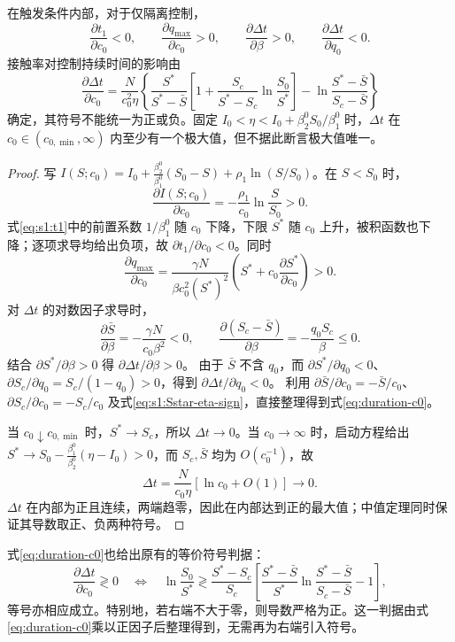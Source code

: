 \begin{proposition}
\label{prop:contact-effects}\label{cor:s1:duration-sensitivity}
在触发条件内部，对于仅隔离控制，
\[
\frac{\partial t_1}{\partial c_0}<0,\qquad
\frac{\partial q_{\max}}{\partial c_0}>0,\qquad
\frac{\partial\Delta t}{\partial\beta}>0,\qquad
\frac{\partial\Delta t}{\partial q_0}<0.
\]
接触率对控制持续时间的影响由
\begin{equation}
\frac{\partial\Delta t}{\partial c_0}
=\frac{N}{c_0^2\eta}
\left\{\frac{S^*}{S^*-\bar S}
\left[1+\frac{S_c}{S^*-S_c}\ln\frac{S_0}{S^*}\right]
-\ln\frac{S^*-\bar S}{S_c-\bar S}\right\}
\label{eq:duration-c0}
\end{equation}
确定，其符号不能统一为正或负。固定 $I_0<\eta<I_0+\beta_2^0S_0/\beta_1^0$ 时，$\Delta t$ 在 $c_0\in(c_{0,\min},\infty)$ 内至少有一个极大值，但不据此断言极大值唯一。
\end{proposition}
\begin{proof}
写 $I(S;c_0)=I_0+\frac{\beta_2^0}{\beta_1^0}(S_0-S)+\rho_1\ln(S/S_0)$。在 $S<S_0$ 时，
\[
\frac{\partial I(S;c_0)}{\partial c_0}=-\frac{\rho_1}{c_0}\ln\frac{S}{S_0}>0.
\]
式\eqref{eq:s1:t1}中的前置系数 $1/\beta_1^0$ 随 $c_0$ 下降，下限 $S^*$ 随 $c_0$ 上升，被积函数也下降；逐项求导均给出负项，故 $\partial t_1/\partial c_0<0$。同时
\[
\frac{\partial q_{\max}}{\partial c_0}
=\frac{\gamma N}{\beta c_0^2(S^*)^2}
\left(S^*+c_0\frac{\partial S^*}{\partial c_0}\right)>0.
\]
对 $\Delta t$ 的对数因子求导时，
\[
\frac{\partial\bar S}{\partial\beta}=-\frac{\gamma N}{c_0\beta^2}<0,
\qquad
\frac{\partial(S_c-\bar S)}{\partial\beta}=-\frac{q_0S_c}{\beta}\le0.
\]
结合 $\partial S^*/\partial\beta>0$ 得 $\partial\Delta t/\partial\beta>0$。
由于 $\bar S$ 不含 $q_0$，而 $\partial S^*/\partial q_0<0$、$\partial S_c/\partial q_0=S_c/(1-q_0)>0$，得到 $\partial\Delta t/\partial q_0<0$。
利用 $\partial\bar S/\partial c_0=-\bar S/c_0$、$\partial S_c/\partial c_0=-S_c/c_0$ 及式\eqref{eq:s1:Sstar-eta-sign}，直接整理得到式\eqref{eq:duration-c0}。

当 $c_0\downarrow c_{0,\min}$ 时，$S^*\to S_c$，所以 $\Delta t\to0$。当 $c_0\to\infty$ 时，启动方程给出
$S^*\to S_0-\frac{\beta_1^0}{\beta_2^0}(\eta-I_0)>0$，而 $S_c,\bar S$ 均为 $O(c_0^{-1})$，故
\[
\Delta t=\frac{N}{c_0\eta}[\ln c_0+O(1)]\longrightarrow0.
\]
$\Delta t$ 在内部为正且连续，两端趋零，因此在内部达到正的最大值；中值定理同时保证其导数取正、负两种符号。
\end{proof}
式\eqref{eq:duration-c0}也给出原有的等价符号判据：
\begin{equation}
\frac{\partial\Delta t}{\partial c_0}\gtrless0
\quad\Longleftrightarrow\quad
\ln\frac{S_0}{S^*}\gtrless
\frac{S^*-S_c}{S_c}
\left[\frac{S^*-\bar S}{S^*}\ln\frac{S^*-\bar S}{S_c-\bar S}-1\right],
\label{eq:duration-c0-equivalent}
\end{equation}
等号亦相应成立。特别地，若右端不大于零，则导数严格为正。这一判据由式\eqref{eq:duration-c0}乘以正因子后整理得到，无需再为右端引入符号。

